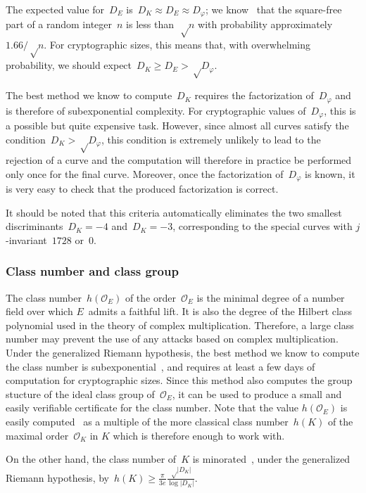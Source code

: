 \documentclass[twocolumn,letterpaper,10pt]{article}
\let\ro\mathcal
\def\abs#1{\left|#1\right|}
\def\pa#1{\left(#1\right)}
\begin{document}
The expected value for~$D_E$ is~$D_K ≈ D_E ≈ D_φ$;
we know~\cite{jis2014cdkd} that the square-free part of
a random integer~$n$ is less than~$√n$
with probability approximately~$1.66/√n$.
For cryptographic sizes, this means that,
with overwhelming probability, we should expect~$D_K \geq D_E > √{D_φ}$.

The best method we know to compute~$D_K$ requires the
factorization of~$D_φ$ and is therefore of subexponential complexity.
For cryptographic values of~$D_φ$, this is a possible but
quite expensive task.
However, since almost all curves satisfy the condition~$D_K > √{D_φ}$,
this condition is extremely unlikely to lead to the rejection of a curve
and the computation will therefore in practice be performed
only once for the final curve.
Moreover, once the factorization of~$D_φ$ is known,
it is very easy to check that the produced
factorization is correct.

It should be noted that this criteria automatically eliminates
the two smallest discriminants~$D_K = -4$ and~$D_K = -3$,
corresponding to the special curves with $j$-invariant~$1728$ or~$0$.

\subsubsection{Class number and class group}
\label{sss:class-group}

The class number~$h(\ro O_E)$ of the order~$\ro O_E$
is the minimal degree of a number field
over which $E$~admits a faithful lift.
It is also the degree of the Hilbert class polynomial
used in the theory of complex multiplication.
Therefore, a large class number may prevent the use
of any attacks based on complex multiplication.
Under the generalized Riemann hypothesis,
the best method we know to compute the class number
is subexponential~\cite{ams1989hmc,chile2009biasse},
and requires at least a few days of computation for cryptographic sizes.
Since this method also computes the group stucture
of the ideal class group of~$\ro O_E$,
it can be used to produce a small and easily verifiable certificate
for the class number.
Note that the value $h(\ro O_E)$ is easily computed~\cite[7.24]{cox1989primes}
as a multiple of the more classical class number~$h(K)$
of the maximal order~$\ro O_K$ in $K$
which is therefore enough to work with.

On the other hand,
the class number of~$K$ is minorated~\cite{cras1990louboutin},
under the generalized Riemann hypothesis,
by~$h(K) ≥ \frac{π}{3e} \frac{√{\abs{D_K}}}{\log \abs{D_K}}$.
\end{document}
